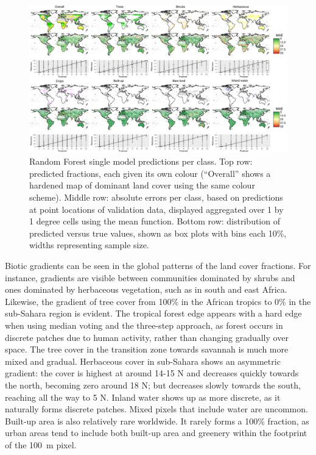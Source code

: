 \documentclass[review,authoryear,3p]{elsarticle}
\begin{document}
\begin{figure}
    \centering
    \includegraphics[width=\textwidth]{article-figures/maps/2020-10-12-walltowall.png}
    \caption{Random Forest single model predictions per class. Top row: predicted fractions, each given its own colour (``Overall'' shows a hardened map of dominant land cover using the same colour scheme). Middle row: absolute errors per class, based on predictions at point locations of validation data, displayed aggregated over 1 by 1 degree cells using the mean function. Bottom row: distribution of predicted versus true values, shown as box plots with bins each 10\%, widths representing sample size.}
    \label{fig-walltowall}
\end{figure}

Biotic gradients can be seen in the global patterns of the land cover fractions.
For instance, gradients are visible between communities dominated by shrubs and ones dominated by herbaceous vegetation, such as in south and east Africa.
Likewise, the gradient of tree cover from 100\% in the African tropics to 0\% in the sub-Sahara region is evident.
The tropical forest edge appears with a hard edge when using median voting and the three-step approach, as forest occurs in discrete patches due to human activity, rather than changing gradually over space.
The tree cover in the transition zone towards savannah is much more mixed and gradual.
Herbaceous cover in sub-Sahara shows an asymmetric gradient: the cover is highest at around 14-15\textdegree{} N and decreases quickly towards the north, becoming zero around 18\textdegree{} N; but decreases slowly towards the south, reaching all the way to 5\textdegree{} N.
Inland water shows up as more discrete, as it naturally forms discrete patches.
Mixed pixels that include water are uncommon.
Built-up area is also relatively rare worldwide.
It rarely forms a 100\% fraction, as urban areas tend to include both built-up area and greenery within the footprint of the 100~m pixel.
\end{document}
